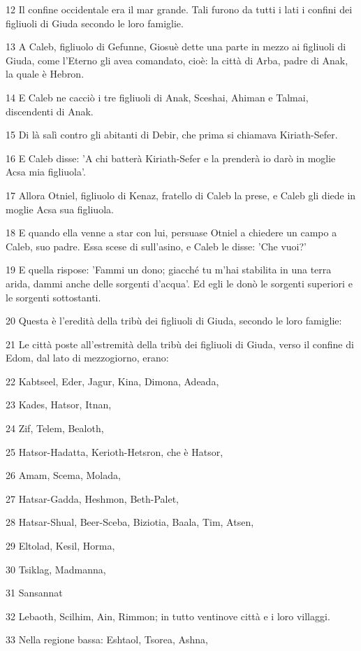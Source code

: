 \par 12 Il confine occidentale era il mar grande. Tali furono da tutti i lati i confini dei figliuoli di Giuda secondo le loro famiglie.
\par 13 A Caleb, figliuolo di Gefunne, Giosuè dette una parte in mezzo ai figliuoli di Giuda, come l'Eterno gli avea comandato, cioè: la città di Arba, padre di Anak, la quale è Hebron.
\par 14 E Caleb ne cacciò i tre figliuoli di Anak, Sceshai, Ahiman e Talmai, discendenti di Anak.
\par 15 Di là salì contro gli abitanti di Debir, che prima si chiamava Kiriath-Sefer.
\par 16 E Caleb disse: 'A chi batterà Kiriath-Sefer e la prenderà io darò in moglie Acsa mia figliuola'.
\par 17 Allora Otniel, figliuolo di Kenaz, fratello di Caleb la prese, e Caleb gli diede in moglie Acsa sua figliuola.
\par 18 E quando ella venne a star con lui, persuase Otniel a chiedere un campo a Caleb, suo padre. Essa scese di sull'asino, e Caleb le disse: 'Che vuoi?'
\par 19 E quella rispose: 'Fammi un dono; giacché tu m'hai stabilita in una terra arida, dammi anche delle sorgenti d'acqua'. Ed egli le donò le sorgenti superiori e le sorgenti sottostanti.
\par 20 Questa è l'eredità della tribù dei figliuoli di Giuda, secondo le loro famiglie:
\par 21 Le città poste all'estremità della tribù dei figliuoli di Giuda, verso il confine di Edom, dal lato di mezzogiorno, erano:
\par 22 Kabtseel, Eder, Jagur, Kina, Dimona, Adeada,
\par 23 Kades, Hatsor, Itnan,
\par 24 Zif, Telem, Bealoth,
\par 25 Hatsor-Hadatta, Kerioth-Hetsron, che è Hatsor,
\par 26 Amam, Scema, Molada,
\par 27 Hatsar-Gadda, Heshmon, Beth-Palet,
\par 28 Hatsar-Shual, Beer-Sceba, Biziotia, Baala, Tim, Atsen,
\par 29 Eltolad, Kesil, Horma,
\par 30 Tsiklag, Madmanna,
\par 31 Sansannat
\par 32 Lebaoth, Scilhim, Ain, Rimmon; in tutto ventinove città e i loro villaggi.
\par 33 Nella regione bassa: Eshtaol, Tsorea, Ashna,
